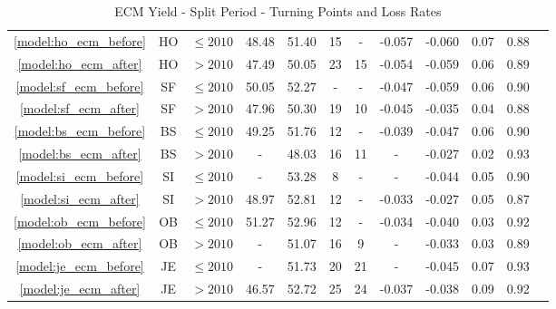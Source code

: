 \begin{table}[htbp]
\begin{tabular}{c c c c c c c c c c c c}
        \textcolor{blue}{\ref{model:ho_ecm_before}}& HO & $\leq 2010$ & 48.48 & 51.40 & 15 & - & -0.057 & -0.060 & 0.07 & 0.88\\
        \textcolor{blue}{\ref{model:ho_ecm_after}}& HO & $>2010$ & 47.49 & 50.05 & 23 & 15 & -0.054 & -0.059 & 0.06 & 0.89\\
        \hline
        \textcolor{blue}{\ref{model:sf_ecm_before}}& SF & $\leq 2010$ & 50.05 & 52.27 & - & - & -0.047 & -0.059 & 0.06 & 0.90\\
        \textcolor{blue}{\ref{model:sf_ecm_after}}& SF & $>2010$ & 47.96 & 50.30 & 19 & 10 & -0.045 & -0.035 & 0.04 & 0.88\\
        \hline
        \textcolor{blue}{\ref{model:bs_ecm_before}}& BS & $\leq 2010$ & 49.25 & 51.76 & 12 & - & -0.039 & -0.047 & 0.06 & 0.90\\
        \textcolor{blue}{\ref{model:bs_ecm_after}}& BS & $>2010$ & - & 48.03 & 16 & 11 & - & -0.027 & 0.02 & 0.93\\
        \hline
        \textcolor{blue}{\ref{model:si_ecm_before}}& SI & $\leq 2010$ & - & 53.28 & 8 & - & - & -0.044 & 0.05 & 0.90\\
        \textcolor{blue}{\ref{model:si_ecm_after}}& SI & $>2010$ & 48.97 & 52.81 & 12 & - & -0.033 & -0.027 & 0.05 & 0.87\\
        \hline
        \textcolor{blue}{\ref{model:ob_ecm_before}}& OB & $\leq 2010$ & 51.27 & 52.96 & 12 & - & -0.034 & -0.040 & 0.03 & 0.92\\
        \textcolor{blue}{\ref{model:ob_ecm_after}}& OB & $>2010$ & - & 51.07 & 16 & 9 & - & -0.033 & 0.03 & 0.89\\
        \hline
        \textcolor{blue}{\ref{model:je_ecm_before}}& JE & $\leq 2010$ & - & 51.73 & 20 & 21 & - & -0.045 & 0.07 & 0.93\\
        \textcolor{blue}{\ref{model:je_ecm_after}}& JE & $>2010$ & 46.57 & 52.72 & 25 & 24 & -0.037 & -0.038 & 0.09 & 0.92\\
        \bottomrule
    \end{tabular}
    \caption{ECM Yield - Split Period - Turning Points and Loss Rates}
    \label{table:ecm_yield_split_period}
\end{table}


